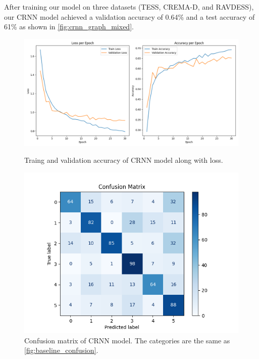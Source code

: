 \documentclass[../main.tex]{subfiles}
\begin{document}
After training our model on three datasets (TESS, CREMA-D, and RAVDESS), our 
CRNN model achieved a validation accuracy of 0.64\% and a test accuracy of 61\%
as shown in \autoref{fig:crnn_graph_mixed}.

\begin{figure}[h]
    \centering
    \begin{minipage}{.5\textwidth}
      \centering
      \includegraphics[width=1.0\linewidth]{../resources/crnn_graph_mixed.png}
      \caption{Traing and validation accuracy of CRNN model along with loss.}
      \label{fig:crnn_graph_mixed}
    \end{minipage}%
    \hfill
    \begin{minipage}{.4\textwidth}
      \centering
      \includegraphics[width=1.0\linewidth]{../resources/crnn_confusion.png}
      \caption{Confusion matrix of CRNN model. The categories are the same 
      as \autoref{fig:baseline_confusion}.} 
      \label{fig:crnn_confusion}
    \end{minipage}
\end{figure}
\end{document}
